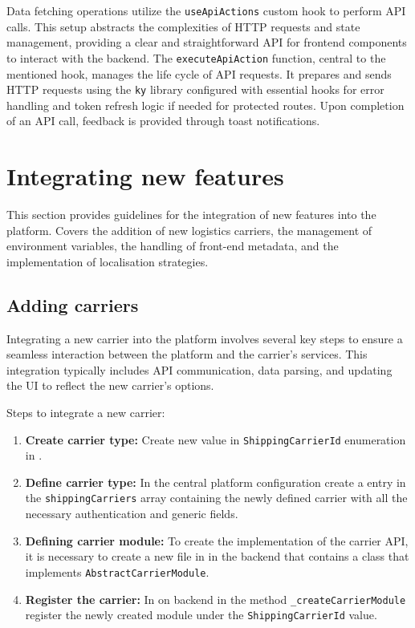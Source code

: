 Data fetching operations utilize the \texttt{useApiActions} custom hook to perform API calls. 
This setup abstracts the complexities of HTTP requests and state management, providing a clear and straightforward API for frontend components to interact with the backend.
The \texttt{executeApiAction} function, central to the mentioned hook, manages the life cycle of API requests. It prepares and sends HTTP requests using the \texttt{ky} library configured with essential hooks for error handling and token refresh logic if needed for protected routes.
Upon completion of an API call, feedback is provided through toast notifications.

\section{Integrating new features}
\label{attachments:programming-platform.integrating}
This section provides guidelines for the integration of new features into the platform. 
Covers the addition of new logistics carriers, the management of environment variables, the handling of front-end metadata, and the implementation of localisation strategies.

\subsection{Adding carriers}
Integrating a new carrier into the platform involves several key steps to ensure a seamless interaction between the platform and the carrier's services. 
This integration typically includes API communication, data parsing, and updating the UI to reflect the new carrier's options.

Steps to integrate a new carrier:
\begin{enumerate}
    \item \textbf{Create carrier type:} Create new value in \texttt{ShippingCarrierId} enumeration in .
    \item \textbf{Define carrier type:} In the central platform configuration  create a entry in the \texttt{shippingCarriers} array containing the newly defined carrier with all the necessary authentication and generic fields.
    \item \textbf{Defining carrier module:} To create the implementation of the carrier API, it is necessary to create a new file in  in the backend that contains a class that implements \texttt{AbstractCarrierModule}.
    \item \textbf{Register the carrier:} In  on backend in the method \texttt{\_createCarrierModule} register the newly created module under the \texttt{ShippingCarrierId} value.
\end{enumerate}

